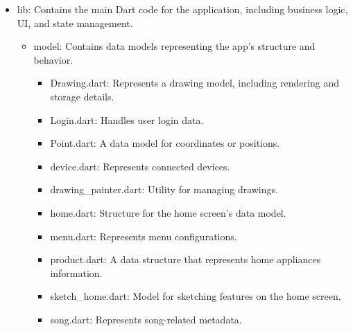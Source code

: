 \documentclass[conference]{IEEEtran}
\begin{document}
\begin{itemize}
    \item lib: Contains the main Dart code for the application, including business logic, UI, and state management.
    \begin{itemize}
        \item model: Contains data models representing the app's structure and behavior.
        \begin{itemize}
            \item Drawing.dart: Represents a drawing model, including rendering and storage details. \\
            \item Login.dart: Handles user login data. \\
            \item Point.dart: A data model for coordinates or positions. \\
            \item device.dart: Represents connected devices. \\
            \item drawing\_painter.dart: Utility for managing drawings. \\
            \item home.dart: Structure for the home screen's data model. \\
            \item menu.dart: Represents menu configurations. \\
            \item product.dart: A data structure that represents home appliances information. \\
            \item sketch\_home.dart: Model for sketching features on the home screen. \\
            \item song.dart: Represents song-related metadata. \\
        \end{itemize}


\end{itemize}
\end{itemize}
\end{document}
